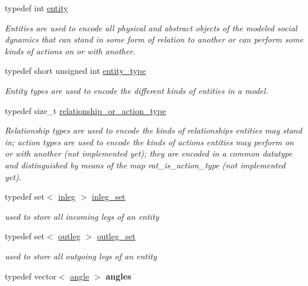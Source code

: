 \begin{DoxyCompactItemize}
typedef int \hyperlink{namespacetricl_a57273122278e8b301844e2a2e1f0742f}{entity}
\begin{DoxyCompactList}\small\item\em Entities are used to encode all physical and abstract objects of the modeled social dynamics that can stand in some form of relation to another or can perform some kinds of actions on or with another. \end{DoxyCompactList}\item 
typedef short unsigned int \hyperlink{namespacetricl_afd4de3aedd5e48cf955f03457386e98f}{entity\+\_\+type}
\begin{DoxyCompactList}\small\item\em Entity types are used to encode the different kinds of entities in a model. \end{DoxyCompactList}\item 
typedef size\+\_\+t \hyperlink{namespacetricl_a2d01894944fb58a8fedc0912a48d13f8}{relationship\+\_\+or\+\_\+action\+\_\+type}
\begin{DoxyCompactList}\small\item\em Relationship types are used to encode the kinds of relationships entities may stand in; action types are used to encode the kinds of actions entities may perform on or with another (not implemented yet); they are encoded in a common datatype and distinguished by means of the map rat\+\_\+is\+\_\+action\+\_\+type (not implemented yet). \end{DoxyCompactList}\item 
\mbox{\label{namespacetricl_a703ed53fa2dba74d8f51ede5fd46038d}} 
typedef set$<$ \hyperlink{structtricl_1_1inleg}{inleg} $>$ \hyperlink{namespacetricl_a703ed53fa2dba74d8f51ede5fd46038d}{inleg\+\_\+set}
\begin{DoxyCompactList}\small\item\em used to store all incoming legs of an entity \end{DoxyCompactList}\item 
\mbox{\label{namespacetricl_ac36fc4606da3d7f9ffd1764942fe5940}} 
typedef set$<$ \hyperlink{structtricl_1_1outleg}{outleg} $>$ \hyperlink{namespacetricl_ac36fc4606da3d7f9ffd1764942fe5940}{outleg\+\_\+set}
\begin{DoxyCompactList}\small\item\em used to store all outgoing legs of an entity \end{DoxyCompactList}\item 
\mbox{\label{namespacetricl_a4ec9b46d6dae5a1d114387bca4029ce5}} 
typedef vector$<$ \hyperlink{structtricl_1_1angle}{angle} $>$ {\bfseries angles}
\end{DoxyCompactItemize}
